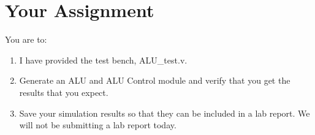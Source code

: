 \section{Your Assignment}

You are to:
\begin{enumerate}
\item I have provided the test bench, ALU\_test.v.
\item Generate an ALU and ALU Control module and verify that you get the results that you expect.
\item Save your simulation results so that they can be included in a lab report.  We will not be submitting a lab report today.
\end{enumerate} 